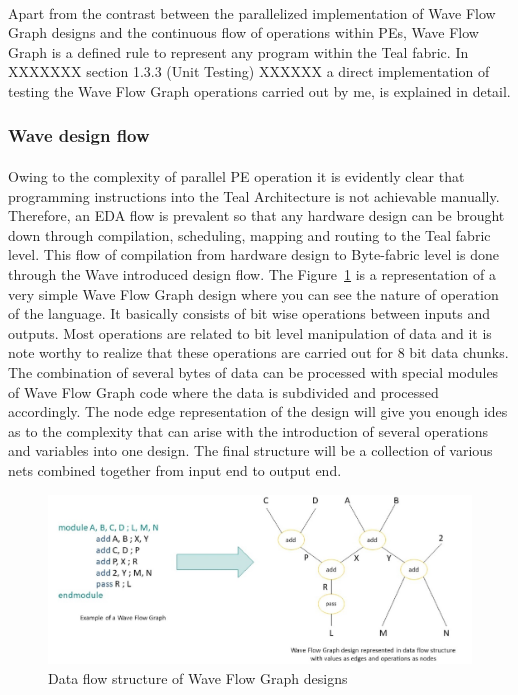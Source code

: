 \paragraph{}
Apart from the contrast between the parallelized implementation of Wave Flow Graph designs and the continuous flow of operations within PEs, Wave Flow Graph is a defined rule to represent any program within the Teal fabric. In XXXXXXX section 1.3.3 (Unit Testing) XXXXXX a direct implementation of testing the Wave Flow Graph operations carried out by me, is explained in detail.

\subsubsection{Wave design flow}
\paragraph{}
Owing to the complexity of parallel PE operation it is evidently clear that programming instructions into the Teal Architecture is not achievable manually. Therefore, an EDA flow is prevalent so that any hardware design can be brought down through compilation, scheduling, mapping and routing to the Teal fabric level. This flow of compilation from hardware design to Byte-fabric level is done through the Wave introduced design flow. The Figure~\ref{Fig:wfgstruct} is a representation of a very simple Wave Flow Graph design where you can see the nature of operation of the language. It basically consists of bit wise operations between inputs and outputs. Most operations are related to bit level manipulation of data and it is note worthy to realize that these operations are carried out for 8 bit data chunks. The combination of several bytes of data can be processed with special modules of Wave Flow Graph code where the data is subdivided and processed accordingly. The node edge representation of the design will give you enough ides as to the complexity that can arise with the introduction of several operations and variables into one design. The final structure will be a collection of various nets combined together from input end to output end.

\begin{figure}[h]
    \centering
    \includegraphics[trim=0cm 0cm 0cm 0cm, clip=true,scale=0.5]{figures/wfg_struct.jpg}
    \caption{Data flow structure of Wave Flow Graph designs\label{Fig:wfgstruct}}\vspace{-4mm}
    \end{figure}

\pagebreak